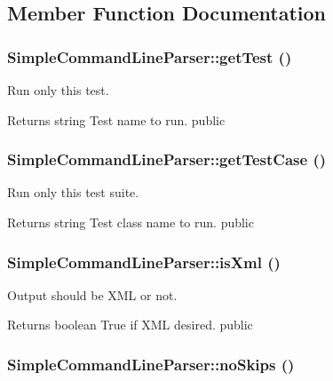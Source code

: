 \subsection{Member Function Documentation}
\hypertarget{class_simple_command_line_parser_a1d42d4407267d9665feeeeca03e8b39a}{
\subsubsection[{getTest}]{\setlength{\rightskip}{0pt plus 5cm}SimpleCommandLineParser::getTest ()}}
\label{class_simple_command_line_parser_a1d42d4407267d9665feeeeca03e8b39a}
Run only this test. \begin{DoxyReturn}{Returns}
string Test name to run.  public 
\end{DoxyReturn}
\hypertarget{class_simple_command_line_parser_a5e43739737c07f53d98565725c9b9b67}{
\subsubsection[{getTestCase}]{\setlength{\rightskip}{0pt plus 5cm}SimpleCommandLineParser::getTestCase ()}}
\label{class_simple_command_line_parser_a5e43739737c07f53d98565725c9b9b67}
Run only this test suite. \begin{DoxyReturn}{Returns}
string Test class name to run.  public 
\end{DoxyReturn}
\hypertarget{class_simple_command_line_parser_ad6c4d5e0a31a8fdc6dadf8e48de72916}{
\subsubsection[{isXml}]{\setlength{\rightskip}{0pt plus 5cm}SimpleCommandLineParser::isXml ()}}
\label{class_simple_command_line_parser_ad6c4d5e0a31a8fdc6dadf8e48de72916}
Output should be XML or not. \begin{DoxyReturn}{Returns}
boolean True if XML desired.  public 
\end{DoxyReturn}
\hypertarget{class_simple_command_line_parser_a61634a1ea5fd4638199ed0a7e5a55115}{
\subsubsection[{noSkips}]{\setlength{\rightskip}{0pt plus 5cm}SimpleCommandLineParser::noSkips ()}}
